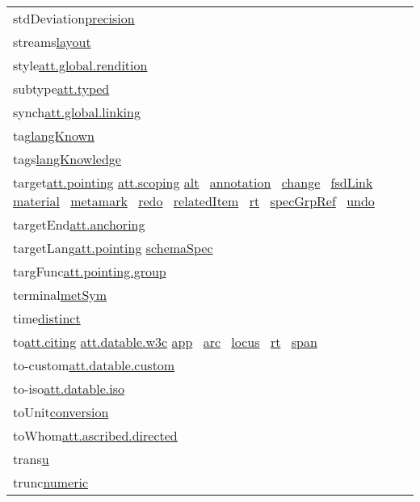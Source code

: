 \begin{longtable}{L{.2\textwidth}P{.8\textwidth}}
stdDeviation\tabcellsep \hyperref[TEI.precision]{precision} \\
streams\tabcellsep \hyperref[TEI.layout]{layout} \\
style\tabcellsep \hyperref[TEI.att.global.rendition]{att.global.rendition}\\
subtype\tabcellsep \hyperref[TEI.att.typed]{att.typed}\\
synch\tabcellsep \hyperref[TEI.att.global.linking]{att.global.linking}\\
tag\tabcellsep \hyperref[TEI.langKnown]{langKnown} \\
tags\tabcellsep \hyperref[TEI.langKnowledge]{langKnowledge} \\
target\tabcellsep \hyperref[TEI.att.pointing]{att.pointing} \hyperref[TEI.att.scoping]{att.scoping} \hyperref[TEI.alt]{alt}  \hyperref[TEI.annotation]{annotation}  \hyperref[TEI.change]{change}  \hyperref[TEI.fsdLink]{fsdLink}  \hyperref[TEI.material]{material}  \hyperref[TEI.metamark]{metamark}  \hyperref[TEI.redo]{redo}  \hyperref[TEI.relatedItem]{relatedItem}  \hyperref[TEI.rt]{rt}  \hyperref[TEI.specGrpRef]{specGrpRef}  \hyperref[TEI.undo]{undo} \\
targetEnd\tabcellsep \hyperref[TEI.att.anchoring]{att.anchoring}\\
targetLang\tabcellsep \hyperref[TEI.att.pointing]{att.pointing} \hyperref[TEI.schemaSpec]{schemaSpec} \\
targFunc\tabcellsep \hyperref[TEI.att.pointing.group]{att.pointing.group}\\
terminal\tabcellsep \hyperref[TEI.metSym]{metSym} \\
time\tabcellsep \hyperref[TEI.distinct]{distinct} \\
to\tabcellsep \hyperref[TEI.att.citing]{att.citing} \hyperref[TEI.att.datable.w3c]{att.datable.w3c} \hyperref[TEI.app]{app}  \hyperref[TEI.arc]{arc}  \hyperref[TEI.locus]{locus}  \hyperref[TEI.rt]{rt}  \hyperref[TEI.span]{span} \\
to-custom\tabcellsep \hyperref[TEI.att.datable.custom]{att.datable.custom}\\
to-iso\tabcellsep \hyperref[TEI.att.datable.iso]{att.datable.iso}\\
toUnit\tabcellsep \hyperref[TEI.conversion]{conversion} \\
toWhom\tabcellsep \hyperref[TEI.att.ascribed.directed]{att.ascribed.directed}\\
trans\tabcellsep \hyperref[TEI.u]{u} \\
trunc\tabcellsep \hyperref[TEI.numeric]{numeric} \\

\end{longtable}
